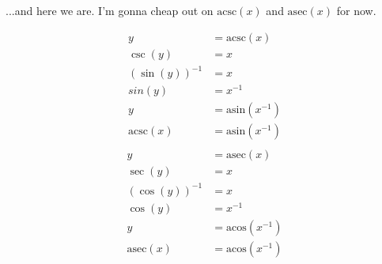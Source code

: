 \documentclass[10pt]{article}
\begin{document}
\begin{multicols}{2}
...and here we are. I'm gonna cheap out on $\mathrm{acsc}(x)$ and $\mathrm{asec}(x)$ for now.

\begin{align*}
   y &=  \mathrm{acsc}(x) \\
   \csc(y) &= x \\
   (\sin(y))^{-1} &= x \\
   sin(y) &= x^{-1} \\
   y &= \mathrm{asin}(x^{-1}) \\
   \mathrm{acsc}(x) &= \mathrm{asin}(x^{-1}) \\
\end{align*}
\begin{align*}
    y &= \mathrm{asec}(x) \\
    \sec(y) &= x \\
    (\cos(y))^{-1} &= x \\
    \cos(y) &= x^{-1} \\
    y &= \mathrm{acos}(x^{-1}) \\
    \mathrm{asec}(x) &= \mathrm{acos}(x^{-1}) \\
\end{align*}

\end{multicols}
\end{document}
